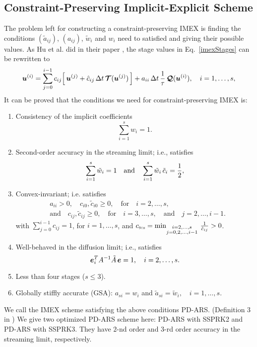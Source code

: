 \subsection{Constraint-Preserving Implicit-Explicit Scheme}
The problem left for constructing a constraint-preserving IMEX is finding the conditions $(\tilde{a}_{ij})$, $(a_{ij})$, $\tilde{w}_{i}$ and $w_{i}$ need to satisfied and giving their possible values.
As Hu et al. did in their paper \cite{hu_etal_2018}, the stage values in Eq.~\eqref{imexStages} can be rewritten to
\begin{equation}
  \boldsymbol{u}^{(i)}
  =\sum_{j=0}^{i-1}c_{ij}\Big[\,\boldsymbol{u}^{(j)}+\hat{c}_{ij}\,\Delta t\,\boldsymbol{\mathcal{T}}(\boldsymbol{u}^{(j)})\,\Big]
  +a_{ii}\,\Delta t\,\frac{1}{\tau}\,\boldsymbol{\mathcal{Q}}(\boldsymbol{u}^{(i)}),\quad i=1,\ldots,s,
  \label{eq:imexStagesRewrite}
\end{equation}
It can be proved \cite{chu_etal_2018} that the conditions we need for constraint-preserving IMEX is:
\begin{enumerate}
    \item Consistency of the implicit coefficients
    \begin{equation}
      \sum_{i=1}^{s}w_{i}=1.
    \end{equation}
    \item Second-order accuracy in the streaming limit; i.e., satisfies \begin{equation}
      \sum_{i=1}^{s}\tilde{w}_{i}=1
      \quad\text{and}\quad
      \sum_{i=1}^{s}\tilde{w}_{i}\,\tilde{c}_{i}=\frac{1}{2},
      \label{eq:orderConditionsEx}
    \end{equation}
    \item Convex-invariant; i.e. satisfies 
    \begin{align}
      &a_{ii}>0, \quad c_{i0},\tilde{c}_{i0}\ge0, \quad \text{for} \quad i=2,\ldots,s, \nonumber \\
      &\text{and} \quad c_{ij},\tilde{c}_{ij}\ge0, \quad \text{for} \quad i=3,\ldots,s, \quad\text{and}\quad j=2,\ldots,i-1.  
    \end{align}
    with $\sum_{j=0}^{i-1}c_{ij}=1$, for $i=1,\ldots,s$, and $c_{\textnormal{\tiny\textsc{Sch}}}=\min_{\substack{i = 2,\ldots,s \\ 
                  j = 0,2,\ldots,i-1}}\,\frac{1}{\hat{c}_{ij}}>0$.
    \item Well-behaved in the diffusion limit; i.e., satisfies \begin{equation}
      \boldsymbol{e}_{i}^{T}A^{-1}\tilde{A}\,\boldsymbol{e} = 1, \quad i=2,\ldots,s.
      \label{eq:diffusionCondition}
    \end{equation}
    \item Less than four stages ($s\le3$).
    \item Globally stiffly accurate (GSA): $a_{si}=w_{i}$ and $\tilde{a}_{si}=\tilde{w}_{i},\quad i=1,\ldots,s$.
\end{enumerate}  
We call the IMEX scheme satisfying the above conditions {PD-ARS}. (Definition 3 in \cite{chu_etal_2018})
We give two optimized PD-ARS scheme here: PD-ARS with SSPRK2 and  PD-ARS with SSPRK3. 
They have $2$-nd order and $3$-rd order accuracy in the streaming limit, respectively.
